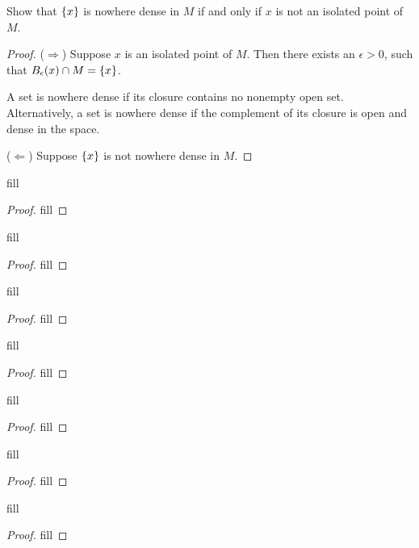 \begin{exercise}{16}
Show that $\{x\}$ is nowhere dense in $M$ if and only if $x$ is not an isolated point of $M$.
\end{exercise}
\begin{proof}
($\Rightarrow$)
Suppose $x$ is an isolated point of $M$.
Then there exists an $\epsilon > 0$, such that $B_\epsilon(x)\cap M = \{x\}$.

A set is nowhere dense if its closure contains no nonempty open set.
Alternatively, a set is nowhere dense if the complement of its closure is open and dense in the space.

($\Leftarrow$)
Suppose $\{x\}$ is not nowhere dense in $M$.


\end{proof} 

\begin{exercise}{19}
fill
\end{exercise}
\begin{proof}
fill
\end{proof} 

\begin{exercise}{21}
fill
\end{exercise}
\begin{proof}
fill
\end{proof} 

\begin{exercise}{24}
fill
\end{exercise}
\begin{proof}
fill
\end{proof} 

\begin{exercise}{25}
fill
\end{exercise}
\begin{proof}
fill
\end{proof} 

\begin{exercise}{26}
fill
\end{exercise}
\begin{proof}
fill
\end{proof} 

\begin{exercise}{28}
fill
\end{exercise}
\begin{proof}
fill
\end{proof} 

\begin{exercise}{29}
fill
\end{exercise}
\begin{proof}
fill
\end{proof} 

